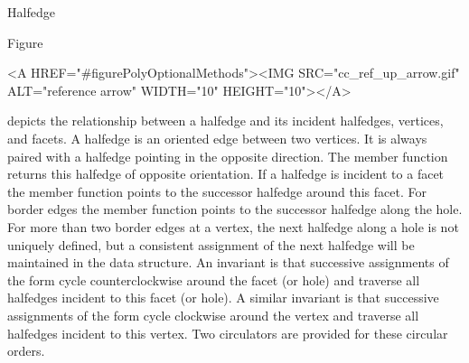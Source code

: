 
\ccRefPageBegin



\begin{ccRefClass}{Halfedge}

\ccDefinition
  
Figure~\begin{ccHtmlOnly}
  <A HREF="#figurePolyOptionalMethods"><IMG 
  SRC="cc_ref_up_arrow.gif" ALT="reference arrow" WIDTH="10" HEIGHT="10"></A>
\end{ccHtmlOnly}
depicts the relationship between a halfedge and its incident
halfedges, vertices, and facets.  A halfedge is an oriented edge
between two vertices. It is always paired with a halfedge pointing in
the opposite direction. The  member function returns
this halfedge of opposite orientation. If a halfedge is incident to a
facet the  member function points to the successor
halfedge around this facet. For border edges the  member
function points to the successor halfedge along the hole. For more
than two border edges at a vertex, the next halfedge along a hole is
not uniquely defined, but a consistent assignment of the next halfedge
will be maintained in the data structure. An invariant is that
successive assignments of the form  cycle
counterclockwise around the facet (or hole) and traverse all halfedges
incident to this facet (or hole). A similar invariant is that successive
assignments of the form  cycle
clockwise around the vertex and traverse all halfedges incident to
this vertex. Two circulators are provided for these circular orders.


\end{ccRefClass}

